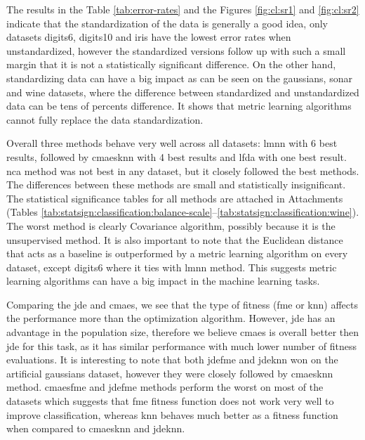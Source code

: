 \documentclass[12pt,a4paper]{report}
\begin{document}


The results in the Table \ref{tab:error-rates} and the Figures \ref{fig:cl:sr1} and \ref{fig:cl:sr2} indicate that the standardization of the data is generally a good idea, only datasets digits6, digits10 and iris have the lowest error rates when unstandardized, however the standardized versions follow up with such a small margin that it is not a statistically significant difference. On the other hand, standardizing data can have a big impact as can be seen on the gaussians, sonar and wine datasets, where the difference between standardized and unstandardized data can be tens of percents difference. It shows that metric learning algorithms cannot fully replace the data standardization.

Overall three methods behave very well across all datasets: \ac{lmnn} with 6 best results, followed by \ac{cmaesknn} with 4 best results and \ac{lfda} with one best result. \ac{nca} method was not best in any dataset, but it closely followed the best methods. The differences between these methods are small and statistically insignificant. The statistical significance tables for all methods are attached in Attachments (Tables \ref{tab:statsign:classification:balance-scale}--\ref{tab:statsign:classification:wine}). The worst method is clearly Covariance algorithm, possibly because it is the unsupervised method. It is also important to note that the Euclidean distance that acts as a baseline is outperformed by a metric learning algorithm on every dataset, except digits6 where it ties with \ac{lmnn} method. This suggests metric learning algorithms can have a big impact in the machine learning tasks.

Comparing the \ac{jde} and \ac{cmaes}, we see that the type of fitness (\ac{fme} or \ac{knn}) affects the performance more than the optimization algorithm. However, \ac{jde} has an advantage in the population size, therefore we believe \ac{cmaes} is overall better then \ac{jde} for this task, as it has similar performance with much lower number of fitness evaluations. It is interesting to note that both \ac{jdefme} and \ac{jdeknn} won on the artificial gaussians dataset, however they were closely followed by \ac{cmaesknn} method. \ac{cmaesfme} and \ac{jdefme} methods perform the worst on most of the datasets which suggests that \ac{fme} fitness function does not work very well to improve classification, whereas \ac{knn} behaves much better as a fitness function when compared to \ac{cmaesknn} and \ac{jdeknn}.
\end{document}
